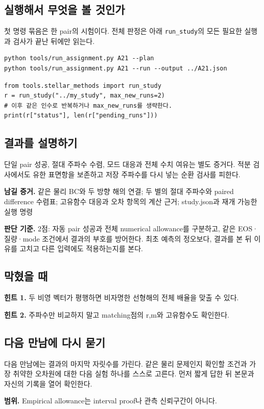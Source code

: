 \documentclass[
  10pt,
  a4paper,
]{article}
\begin{document}
\newpage

\subsection{실행해서 무엇을 볼
것인가}\label{uxc2e4uxd589uxd574uxc11c-uxbb34uxc5c7uxc744-uxbcfc-uxac83uxc778uxac00}

첫 명령 묶음은 한 pair의 시험이다. 전체 판정은 아래
\texttt{run\_study}의 모든 필요한 실행과 검사가 끝난 뒤에만 읽는다.

\begin{verbatim}
python tools/run_assignment.py A21 --plan
python tools/run_assignment.py A21 --run --output ../A21.json
\end{verbatim}

\begin{verbatim}
from tools.stellar_methods import run_study
r = run_study("../my_study", max_new_runs=2)
# 이후 같은 인수로 반복하거나 max_new_runs를 생략한다.
print(r["status"], len(r["pending_runs"]))
\end{verbatim}

\subsection{결과를
설명하기}\label{uxacb0uxacfcuxb97c-uxc124uxba85uxd558uxae30}

단일 pair 성공, 절대 주파수 수렴, 모드 대응과 전체 수치 여유는 별도
증거다. 적분 검사에서도 유한 표면항을 보존하고 저장 주파수를 다시 넣는
순환 검사를 피한다.

\textbf{남길 증거.} 같은 물리 BC와 두 방향 해의 연결; 두 별의 절대
주파수와 paired difference 수렴표; 고유함수 대응과 오차 항목의 계산
근거; study.json과 재개 가능한 실행 명령

\textbf{판단 기준.} 2점: 자동 pair 성공과 전체 numerical allowance를
구분하고, 같은 EOS·질량·mode 조건에서 결과의 부호를 방어한다. 최초
예측의 정오보다, 결과를 본 뒤 이유를 고치고 다른 입력에도 적용하는지를
본다.

\subsection{막혔을 때}\label{uxb9c9uxd614uxc744-uxb54c}

\textbf{힌트 1.} 두 비영 벡터가 평행하면 비자명한 선형해의 전체 배율을
맞출 수 있다.

\textbf{힌트 2.} 주파수만 비교하지 말고 matching점의 r,m와 고유함수도
확인한다.

\subsection{다음 만남에 다시
묻기}\label{uxb2e4uxc74c-uxb9ccuxb0a8uxc5d0-uxb2e4uxc2dc-uxbb3buxae30}

다음 만남에는 결과의 마지막 자릿수를 가린다. 같은 물리 문제인지 확인할
조건과 가장 취약한 오차원에 대한 다음 실험 하나를 스스로 고른다. 먼저
짧게 답한 뒤 본문과 자신의 기록을 열어 확인한다.

\textbf{범위.} Empirical allowance는 interval proof나 관측 신뢰구간이
아니다.
\end{document}
